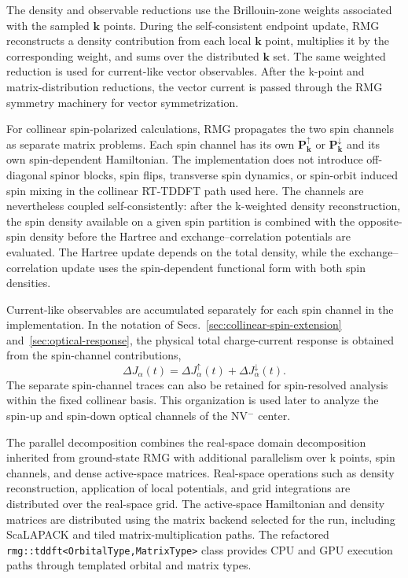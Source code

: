 The density and observable reductions use the Brillouin-zone weights
associated with the sampled $\mathbf k$ points.  During the
self-consistent endpoint update, RMG reconstructs a density
contribution from each local $\mathbf k$ point, multiplies it by the
corresponding weight, and sums over the distributed $\mathbf k$ set.
The same weighted reduction is used for current-like vector
observables.  After the k-point and matrix-distribution reductions,
the vector current is passed through the RMG symmetry machinery for
vector symmetrization.

For collinear spin-polarized calculations, RMG propagates the two spin
channels as separate matrix problems.  Each spin channel has its own
$\mathbf P_{\mathbf k}^{\uparrow}$ or
$\mathbf P_{\mathbf k}^{\downarrow}$ and its own spin-dependent
Hamiltonian.  The implementation does not introduce off-diagonal
spinor blocks, spin flips, transverse spin dynamics, or spin-orbit
induced spin mixing in the collinear RT-TDDFT path used here.  The
channels are nevertheless coupled self-consistently: after the
k-weighted density reconstruction, the spin density available on a
given spin partition is combined with the opposite-spin density before
the Hartree and exchange--correlation potentials are evaluated.  The
Hartree update depends on the total density, while the
exchange--correlation update uses the spin-dependent functional form
with both spin densities.

Current-like observables are accumulated separately for each spin
channel in the implementation.  In the notation of
Secs.~\ref{sec:collinear-spin-extension} and~\ref{sec:optical-response},
the physical total charge-current response is obtained from the
spin-channel contributions,
\begin{equation}
  \Delta J_\alpha(t)
  =
  \Delta J_\alpha^\uparrow(t)
  +
  \Delta J_\alpha^\downarrow(t).
  \label{eq:impl_spin_sum_current}
\end{equation}
The separate spin-channel traces can also be retained for
spin-resolved analysis within the fixed collinear basis.  This
organization is used later to analyze the spin-up and spin-down
optical channels of the NV$^{-}$ center.

The parallel decomposition combines the real-space domain
decomposition inherited from ground-state RMG with additional
parallelism over k points, spin channels, and dense active-space
matrices.  Real-space operations such as density reconstruction,
application of local potentials, and grid integrations are distributed
over the real-space grid.  The active-space Hamiltonian and density
matrices are distributed using the matrix backend selected for the
run, including ScaLAPACK and tiled matrix-multiplication paths.  The
refactored \texttt{rmg::tddft<OrbitalType,MatrixType>} class provides
CPU and GPU execution paths through templated orbital and matrix
types.

